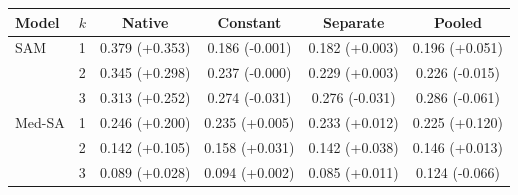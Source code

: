 \begin{tabular}{llcccc}
\toprule
Model & $k$ & Native & Constant & Separate & Pooled \\
\midrule
SAM & 1 & 0.379 (+0.353) & 0.186 (-0.001) & 0.182 (+0.003) & 0.196 (+0.051) \\
 & 2 & 0.345 (+0.298) & 0.237 (-0.000) & 0.229 (+0.003) & 0.226 (-0.015) \\
 & 3 & 0.313 (+0.252) & 0.274 (-0.031) & 0.276 (-0.031) & 0.286 (-0.061) \\
\midrule
Med-SA & 1 & 0.246 (+0.200) & 0.235 (+0.005) & 0.233 (+0.012) & 0.225 (+0.120) \\
 & 2 & 0.142 (+0.105) & 0.158 (+0.031) & 0.142 (+0.038) & 0.146 (+0.013) \\
 & 3 & 0.089 (+0.028) & 0.094 (+0.002) & 0.085 (+0.011) & 0.124 (-0.066) \\
\bottomrule
\end{tabular}
